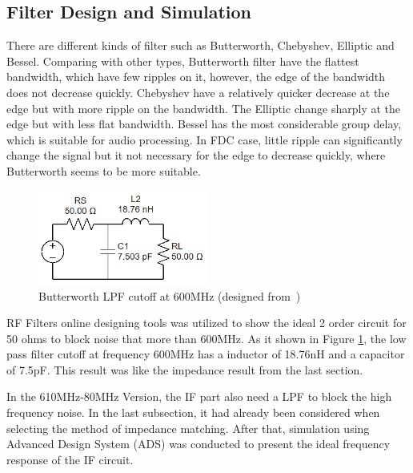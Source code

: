 \documentclass[12pt, a4paper]{report}
\begin{document}
\subsection{Filter Design and Simulation}

There are different kinds of filter such as Butterworth, Chebyshev, Elliptic and Bessel. Comparing with other types, Butterworth filter have the flattest bandwidth, which have few ripples on it, however, the edge of the bandwidth does not decrease quickly. Chebyshev have a relatively quicker decrease at the edge but with more ripple on the bandwidth. The Elliptic change sharply at the edge but with less flat bandwidth. Bessel has the most considerable group delay, which is suitable for audio processing. In FDC case, little ripple can significantly change the signal but it not necessary for the edge to decrease quickly, where Butterworth seems to be more suitable.


\begin{figure}[htbp]     \begin{centering}
    \includegraphics[width=0.5\textwidth]{img/sim0.png}
    \caption{\label{Fig:sim0}Butterworth LPF cutoff at 600MHz (designed from~\cite{ref:rf_tools})}
    \end{centering}
    
\end{figure}


RF Filters online designing tools\cite{ref:rf_tools} was utilized to show the ideal 2 order circuit for 50 ohms to block noise that more than 600MHz. As it shown in Figure \ref{Fig:sim0}, the low pass filter cutoff at frequency 600MHz has a inductor of 18.76nH and a capacitor of 7.5pF. This result was like the impedance result from the last section.

In the 610MHz-80MHz Version, the IF part also need a LPF to block the high frequency noise. In the last subsection, it had already been considered when selecting the method of impedance matching. After that, simulation using Advanced Design System (ADS) was conducted to present the ideal frequency response of the IF circuit.
\end{document}
